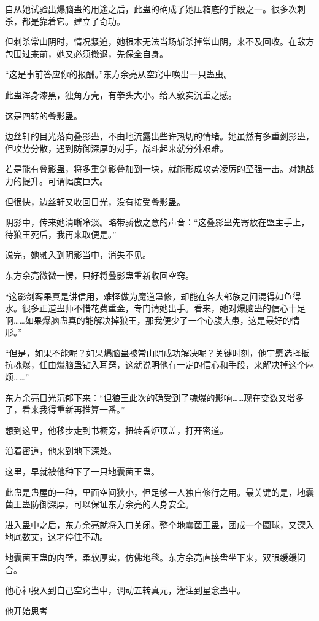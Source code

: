 \begin{this_body}
自从她试验出爆脑蛊的用途之后，此蛊的确成了她压箱底的手段之一。很多次刺杀，都是靠着它。建立了奇功。

但刺杀常山阴时，情况紧迫，她根本无法当场斩杀掉常山阴，来不及回收。在敌方包围过来前，她又必须撤退，先保全自身。

“这是事前答应你的报酬。”东方余亮从空窍中唤出一只蛊虫。

此蛊浑身漆黑，独角方壳，有拳头大小。给人敦实沉重之感。

这是四转的叠影蛊。

边丝轩的目光落向叠影蛊，不由地流露出些许热切的情绪。她虽然有多重剑影蛊，但攻势分散，遇到防御深厚的对手，战斗起来就分外艰难。

若是能有叠影蛊，将多重剑影叠加到一块，就能形成攻势凌厉的至强一击。对她战力的提升。可谓幅度巨大。

但很快，边丝轩又收回目光，没有接受叠影蛊。

阴影中，传来她清晰冷淡。略带骄傲之意的声音：“这叠影蛊先寄放在盟主手上，待狼王死后，我再来取便是。”

说完，她融入到阴影当中，消失不见。

东方余亮微微一愣，只好将叠影蛊重新收回空窍。

“这影剑客果真是讲信用，难怪做为魔道蛊修，却能在各大部族之间混得如鱼得水。很多正道蛊师不惜花费重金，专门请她出手。看来，她对爆脑蛊的信心十足啊……如果爆脑蛊真的能解决掉狼王，那我便少了一个心腹大患，这是最好的情形。”

“但是，如果不能呢？如果爆脑蛊被常山阴成功解决呢？关键时刻，他宁愿选择抵抗魂爆，任由爆脑蛊钻入耳窍，这就说明他有一定的信心和手段，来解决掉这个麻烦……”

东方余亮目光沉郁下来：“但狼王此次的确受到了魂爆的影响……现在变数又增多了，看来我得重新再推算一番。”

想到这里，他移步走到书橱旁，扭转香炉顶盖，打开密道。

沿着密道，他来到地下深处。

这里，早就被他种下了一只地囊菌王蛊。

此蛊是蛊屋的一种，里面空间狭小，但足够一人独自修行之用。最关键的是，地囊菌王蛊防御深厚，可以保证东方余亮的人身安全。

进入蛊中之后，东方余亮就将入口关闭。整个地囊菌王蛊，团成一个圆球，又深入地底数丈，这才停住不动。

地囊菌王蛊的内壁，柔软厚实，仿佛地毯。东方余亮直接盘坐下来，双眼缓缓闭合。

他心神投入到自己空窍当中，调动五转真元，灌注到星念蛊中。

他开始思考——


\end{this_body}
